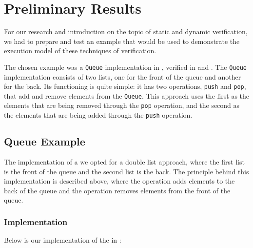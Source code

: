 
%

\chapter{Preliminary Results}
\label{cha:preliminary_results}

For our research and introduction on the topic of static and dynamic verification, 
we had to prepare and test an example that would be used to demonstrate the 
execution model of these techniques of verification. 

The chosen example was a \texttt{Queue} implementation in \ocaml, 
verified in \why and \gospellang. The \texttt{Queue} implementation 
consists of two lists, one for the front of the queue and another for 
the back. Its functioning is quite simple: it has two operations, 
\texttt{push} and \texttt{pop}, that add and remove elements from the \texttt{Queue}. 
This approach uses the first  as the elements that are 
being removed through the \texttt{pop} operation, and the second  
as the elements that are being added through the \texttt{push} operation.

\section{Queue Example}
\label{sec:queue_example}

The implementation of a  we opted for a double list approach, 
where the first list is the front of the queue and the second list is the back.
The principle behind this implementation is described above, where the 
 operation adds elements to the back of the queue and the 
 operation removes elements from the front of the queue.

\subsection{Implementation}
\label{subsec:implementation}

Below is our implementation of the  in \ocaml:

